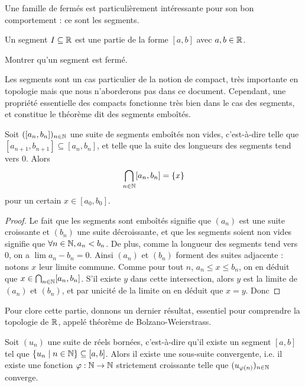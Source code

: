 Une famille de fermés est particulièrement intéressante pour son bon comportement : ce sont les segments.

\begin{defi}[Segment]
    Un segment $I\subseteq\mathbb{R}$ est une partie de la forme $[a,b]$ avec $a,b\in\mathbb{R}$.
\end{defi}

\begin{exo}
    Montrer qu'un segment est fermé.
\end{exo}

Les segments sont un cas particulier de la notion de compact, très importante en topologie mais que nous n'aborderons pas dans ce document. Cependant, une propriété essentielle des compacts fonctionne très bien dans le cas des segments, et constitue le théorème dit des segments emboîtés.

\begin{them}
    Soit $([a_n,b_n])_{n\in\mathbb{N}}$ une suite de segments emboîtés non vides, c'est-à-dire telle que $[a_{n+1},b_{n+1}]\subseteq [a_n,b_n]$, et telle que la suite des longueurs des segments tend vers $0$. Alors $$\bigcap_{n\in\mathbb{N}} [a_n,b_n] = \{x\}$$ pour un certain $x\in [a_0,b_0]$.
\end{them}

\begin{proof}
    Le fait que les segments sont emboîtés signifie que $(a_n)$ est une suite croissante et $(b_n)$ une suite décroissante, et que les segments soient non vides signifie que $\forall n\in\mathbb{N},a_n < b_n$. De plus, comme la longueur des segments tend vers $0$, on a $\lim a_n-b_n = 0$. Ainsi $(a_n)$ et $(b_n)$ forment des suites adjacente : notons $x$ leur limite commune. Comme pour tout $n$, $a_n\leq x \leq b_n$, on en déduit que $x\in \bigcap_{n\in\mathbb{N}} [a_n,b_n]$. S'il existe $y$ dans cette intersection, alors $y$ est la limite de $(a_n)$ et $(b_n)$, et par unicité de la limite on en déduit que $x=y$. Donc 
\end{proof}

Pour clore cette partie, donnons un dernier résultat, essentiel pour comprendre la topologie de $\mathbb{R}$, appelé théorème de Bolzano-Weierstrass.

\begin{them}
    Soit $(u_n)$ une suite de réels bornées, c'est-à-dire qu'il existe un segment $[a,b]$ tel que $\{u_n\;|\;n\in\mathbb{N}\}\subseteq[a,b]$. Alors il existe une sous-suite convergente, i.e. il existe une fonction $\varphi : \mathbb{N} \to\mathbb{N}$ strictement croissante telle que $(u_{\varphi(n)})_{n\in\mathbb{N}}$ converge.
\end{them}

